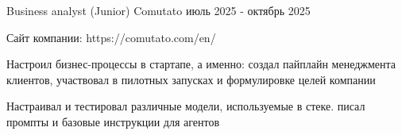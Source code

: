 

\begin{cventries}


  \cventry
    {Business analyst (Junior)} %
    {Comutato} %
    {} %
    {июль 2025 - октябрь 2025} %
    {
      \begin{cvitems} %
       \item {Сайт компании: https://comutato.com/en/}
        \item {Настроил бизнес-процессы в стартапе, а именно: создал пайплайн менеджмента клиентов, участвовал в пилотных запусках и формулировке целей компании}
        \item {Настраивал и тестировал различные модели, используемые в стеке. писал промпты и базовые инструкции для агентов}
      \end{cvitems}
    }
\end{cventries}
